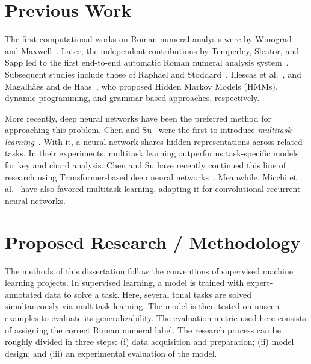 \documentclass[12pt]{article}
\newcommand{\guide}[1]{}
\begin{document}
\section*{Previous Work}

\guide{Historical}
The first computational works on Roman numeral analysis were by Winograd~\cite{winograd1968linguistics} and Maxwell~\cite{maxwell1992expert}.
Later, the independent contributions by Temperley, Sleator, and Sapp led to the first end-to-end automatic Roman numeral analysis system~\cite{temperley2004cognition, sleator2003melisma, sapp2009tsroot}.
Subsequent studies include those of Raphael and Stoddard~\cite{raphael2004functional}, Illescas et al.~\cite{illescas2007harmonic}, and Magalh\~aes and de Haas~\cite{magalhaes2011functional}, who proposed Hidden Markov Models (HMMs), dynamic programming, and grammar-based approaches, respectively.

\guide{Nowadays}
More recently, deep neural networks have been the preferred method for approaching this problem.
Chen and Su~\cite{chen2018functional} were the first to introduce \emph{multitask learning}~\cite{ruder2017overview}.
With it, a neural network shares hidden representations across related tasks.
In their experiments, multitask learning outperforms task-specific models for key and chord analysis.
Chen and Su have recently continued this line of research using Transformer-based deep neural networks~\cite{chen2021attend}.
Meanwhile, Micchi et al.~\cite{micchi2020not} have also favored multitask learning, adapting it for convolutional recurrent neural networks.


\section*{Proposed Research / Methodology}

The methods of this dissertation follow the conventions of supervised machine learning projects.
In supervised learning, a model is trained with expert-annotated data to solve a task.
Here, several tonal tasks are solved simultaneously via multitask learning.
The model is then tested on unseen examples to evaluate its generalizability.
The evaluation metric used here consists of assigning the correct Roman numeral label.
The research process can be roughly divided in three steps:
(i) data acquisition and preparation;
(ii) model design;
and (iii) an experimental evaluation of the model.
\end{document}
